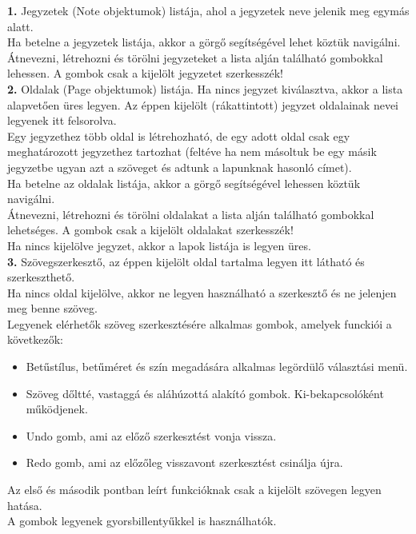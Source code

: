 \vspace{5pt} \noindent \textbf{1.} Jegyzetek (Note objektumok) listája, ahol a jegyzetek neve jelenik meg egymás alatt. 
\\Ha betelne a jegyzetek listája, akkor a görgő segítségével lehet köztük navigálni.
\\Átnevezni, létrehozni és törölni jegyzeteket a lista alján található gombokkal lehessen. A gombok csak a kijelölt jegyzetet szerkesszék!
\vspace{5pt} \\ \textbf{2.} Oldalak (Page objektumok) listája. Ha nincs jegyzet kiválasztva, akkor a lista alapvetően üres legyen. Az éppen kijelölt (rákattintott) jegyzet oldalainak nevei legyenek itt felsorolva. 
\\Egy jegyzethez több oldal is létrehozható, de egy adott oldal csak egy meghatározott jegyzethez tartozhat (feltéve ha nem másoltuk be egy másik jegyzetbe ugyan azt a szöveget és adtunk a lapunknak hasonló címet). 
\\Ha betelne az oldalak listája, akkor a görgő segítségével lehessen köztük navigálni. 
\\Átnevezni, létrehozni és törölni oldalakat a lista alján található gombokkal lehetséges. A gombok csak a kijelölt oldalakat szerkesszék!
\\Ha nincs kijelölve jegyzet, akkor a lapok listája is legyen üres.
\vspace{5pt} \\ \textbf{3.} Szövegszerkesztő, az éppen kijelölt oldal tartalma legyen itt látható és szerkeszthető. 
\\Ha nincs oldal kijelölve, akkor ne legyen használható a szerkesztő és ne jelenjen meg benne szöveg. 
\vspace{5pt} \\Legyenek elérhetők szöveg szerkesztésére alkalmas gombok, amelyek funckiói a következők: 
\begin{itemize}
	\item Betűstílus, betűméret és szín megadására alkalmas legördülő választási menü.
	\item Szöveg dőltté, vastaggá és aláhúzottá alakító gombok. Ki-bekapcsolóként működjenek.
	\item Undo gomb, ami az előző szerkesztést vonja vissza.
	\item Redo gomb, ami az előzőleg visszavont szerkesztést csinálja újra.
\end{itemize}
Az első és második pontban leírt funkcióknak csak a kijelölt szövegen legyen hatása.
\\A gombok legyenek gyorsbillentyűkkel is használhatók.


